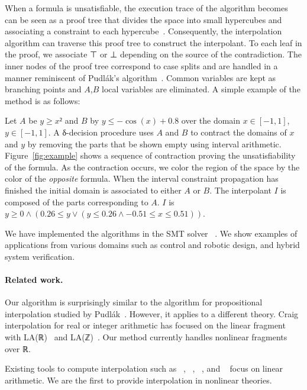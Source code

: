 When a formula is unsatisfiable, the execution trace of the algorithm becomes can be seen as a proof tree that divides the space into small hypercubes and associating a constraint to each hypercube~\cite{DBLP:conf/synasc/GaoKC14}. Consequently, the interpolation algorithm can traverse this proof tree to construct the interpolant. To each leaf in the proof, we associate ⊤ or ⊥ depending on the source of the contradiction. The inner nodes of the proof tree correspond to case splits and are handled in a manner reminiscent of Pudl{\'a}k's algorithm~\cite{MR1472134}. Common variables are kept as branching points and $A$,$B$ local variables are eliminated. A simple example of the method is as follows:

\begin{example}
Let $A$ be $y≥x²$ and $B$ by $y ≤ -\cos(x) + 0.8$ over the domain $x∈[-1,1]$, $y∈[-1,1]$.
A δ-decision procedure uses $A$ and $B$ to contract the domains of $x$ and $y$ by removing the parts that be shown empty using interval arithmetic.
Figure~\ref{fig:example} shows a sequence of contraction proving the unsatisfiability of the formula.
As the contraction occurs, we color the region of the space by the color of the \emph{opposite} formula.
When the interval constraint propagation has finished the initial domain is associated to either $A$ or $B$.
The interpolant $I$ is composed of the parts corresponding to $A$.
$I$ is $y ≥ 0 ∧ (0.26 ≤ y ∨ (y ≤ 0.26 ∧ -0.51 ≤ x ≤ 0.51))$.
\end{example}

We have implemented the algorithms in the SMT solver \dReal~\cite{DBLP:conf/cade/GaoKC13}. We show examples of applications from various domains such as control and robotic design, and hybrid system verification.  

\paragraph{Related work.}
Our algorithm is surprisingly similar to the algorithm for propositional interpolation studied by Pudl{\'a}k~\cite{MR1472134}.
However, it applies to a different theory.
Craig interpolation for real or integer arithmetic has focused on the linear fragment with LA(ℝ)~\cite{DBLP:conf/tacas/McMillan04,DBLP:conf/vmcai/RybalchenkoS07} and LA(ℤ)~\cite{DBLP:conf/cade/BrilloutKRW10,DBLP:conf/tacas/GriggioLS11}.
Our method currently handles nonlinear fragments over ℝ.

Existing tools to compute interpolation such as
\mathsat~\cite{mathsat5},
\princess~\cite{DBLP:conf/cade/BrilloutKRW10},
\smtinterpol~\cite{DBLP:conf/spin/ChristHN12}, and
\zthree~\cite{DBLP:conf/fmcad/McMillan11}
focus on linear arithmetic.
We are the first to provide interpolation in nonlinear theories.


